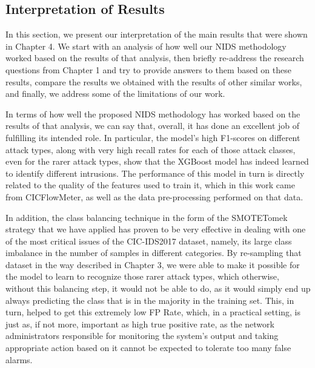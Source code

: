 \subsection{Interpretation of Results}

In this section, we present our interpretation of the main results that were shown in Chapter 4. We start with an analysis of how well our NIDS methodology worked based on the results of that analysis, then briefly re-address the research questions from Chapter 1 and try to provide answers to them based on these results, compare the results we obtained with the results of other similar works, and finally, we address some of the limitations of our work.

In terms of how well the proposed NIDS methodology has worked based on the results of that analysis, we can say that, overall, it has done an excellent job of fulfilling its intended role. In particular, the model’s high F1-scores on different attack types, along with very high recall rates for each of those attack classes, even for the rarer attack types, show that the XGBoost model has indeed learned to identify different intrusions. The performance of this model in turn is directly related to the quality of the features used to train it, which in this work came from CICFlowMeter, as well as the data pre-processing performed on that data.

In addition, the class balancing technique in the form of the SMOTETomek strategy that we have applied has proven to be very effective in dealing with one of the most critical issues of the CIC-IDS2017 dataset, namely, its large class imbalance in the number of samples in different categories. By re-sampling that dataset in the way described in Chapter 3, we were able to make it possible for the model to learn to recognize those rarer attack types, which otherwise, without this balancing step, it would not be able to do, as it would simply end up always predicting the class that is in the majority in the training set. This, in turn, helped to get this extremely low FP Rate, which, in a practical setting, is just as, if not more, important as high true positive rate, as the network administrators responsible for monitoring the system’s output and taking appropriate action based on it cannot be expected to tolerate too many false alarms.

